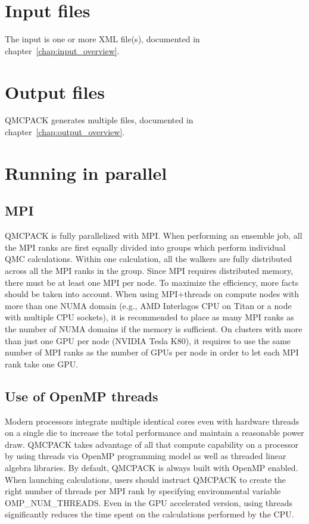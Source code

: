 \section{Input files}
\label{sec:inputs}
The input is one or more XML file(s), documented in chapter~\ref{chap:input_overview}.

\section{Output files}
QMCPACK generates multiple files, documented in chapter~\ref{chap:output_overview}.

\section{Running in parallel}
\label{sec:parallelrunning}


\subsection{MPI}
QMCPACK is fully parallelized with MPI. When performing an ensemble job, all
the MPI ranks are first equally divided into groups which perform individual
QMC calculations. Within one calculation, all the walkers are fully distributed
across all the MPI ranks in the group. Since MPI requires distributed memory,
there must be at least one MPI per node. To maximize the efficiency, more facts
should be taken into account. When using MPI+threads on compute nodes with more
than one NUMA domain (e.g., AMD Interlagos CPU on Titan or a node with multiple
CPU sockets), it is recommended to place as many MPI ranks as the number of
NUMA domains if the memory is sufficient. On clusters with more than just one
GPU per node (NVIDIA Tesla K80), it requires to use the same number of MPI
ranks as the number of GPUs per node in order to let each MPI rank take one GPU.

\subsection{Use of OpenMP threads}
\label{sec:openmprunning}
Modern processors integrate multiple identical cores even with hardware threads
on a single die to increase the total performance and maintain a reasonable
power draw. QMCPACK takes advantage of all that compute capability on a
processor by using threads via OpenMP programming model as well as threaded linear algebra libraries. By default, QMCPACK is always built with OpenMP enabled. When launching calculations, users should instruct QMCPACK to create the right number of threads per MPI rank by specifying environmental variable OMP\_NUM\_THREADS. Even in the GPU accelerated version, using threads significantly reduces the time spent on the calculations performed by the CPU.


